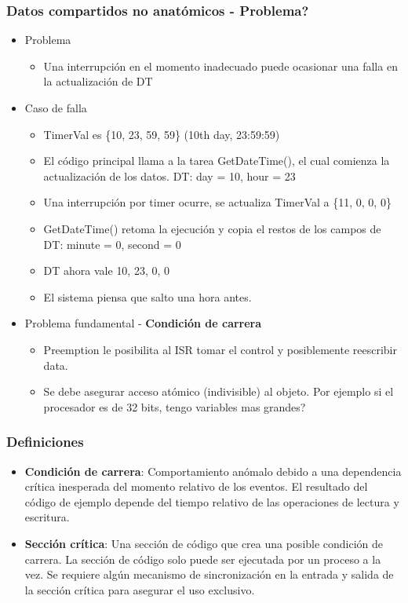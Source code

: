 \documentclass[10.5pt,scale=1.0,t,aspectratio=169,hyperref={pdfpagelabels=false}]{beamer}
\begin{document}
\begin{frame}
	\frametitle{Datos compartidos no anatómicos - Problema?}
	\begin{itemize}
		\item Problema
		\begin{itemize}
			\item Una interrupción en el momento inadecuado puede ocasionar una falla en la actualización de DT
		\end{itemize}
		\item Caso de falla
		\begin{itemize}
			\item TimerVal es \{10, 23, 59, 59\} (10th day, 23:59:59)
			\item El código principal llama a la tarea GetDateTime(), el cual comienza la actualización de los datos. DT: day = 10, hour = 23
			\item Una interrupción por timer ocurre, se actualiza TimerVal a \{11, 0, 0, 0\}
			\item GetDateTime() retoma la ejecución y copia el restos de los campos de DT: minute = 0, second = 0
			\item DT ahora vale {10, 23, 0, 0}
			\item El sistema piensa que salto una hora antes. 
		\end{itemize}
		\item Problema fundamental - \textbf{Condición de carrera}
		\begin{itemize}
			\item Preemption le posibilita al ISR tomar el control y posiblemente reescribir data.
			\item Se debe asegurar acceso atómico (indivisible) al objeto. Por ejemplo si el procesador es de 32 bits, tengo variables mas grandes?
		\end{itemize}
	\end{itemize}
\end{frame}
\begin{frame}
	\frametitle{Definiciones}
	\begin{itemize}
		\item \textbf{Condición de carrera}: Comportamiento anómalo debido a una dependencia crítica inesperada del momento relativo de los eventos. El resultado del código de ejemplo depende del tiempo relativo de las operaciones de lectura y escritura.
		\item \textbf{Sección crítica}: Una sección de código que crea una posible condición de carrera. La sección de código solo puede ser ejecutada por un proceso a la vez. Se requiere algún mecanismo de sincronización en la entrada y salida de la sección crítica para asegurar el uso exclusivo.
	\end{itemize}
\end{frame}
\end{document}
